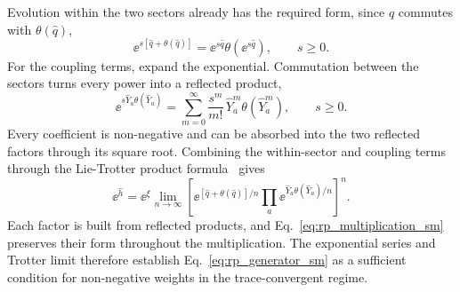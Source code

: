Evolution within the two sectors already has the required form, since $\hat q$ commutes with $\theta(\hat q)$,
\begin{equation}
    \ee^{s[\hat q+\theta(\hat q)]}
    =\ee^{s\hat q}\theta(\ee^{s\hat q}),\qquad s\ge0.
\end{equation}
For the coupling terms, expand the exponential. Commutation between the sectors turns every power into a reflected product,
\begin{equation}
    \ee^{s\hat Y_a\theta(\hat Y_a)}
    =\sum_{m=0}^{\infty}\frac{s^m}{m!}\,
    \hat Y_a^m\theta(\hat Y_a^m),\qquad s\ge0.
\end{equation}
Every coefficient is non-negative and can be absorbed into the two reflected factors through its square root. Combining the within-sector and coupling terms through the Lie-Trotter product formula~\cite{trotter1959product} gives
\begin{equation}
    \ee^{\hat h}
    =\ee^\xi\lim_{n\to\infty}
    \left[
    \ee^{[\hat q+\theta(\hat q)]/n}
    \prod_a\ee^{\hat Y_a\theta(\hat Y_a)/n}
    \right]^n.
\end{equation}
Each factor is built from reflected products, and Eq.~\eqref{eq:rp_multiplication_sm} preserves their form throughout the multiplication. The exponential series and Trotter limit therefore establish Eq.~\eqref{eq:rp_generator_sm} as a sufficient condition for non-negative weights in the trace-convergent regime.

